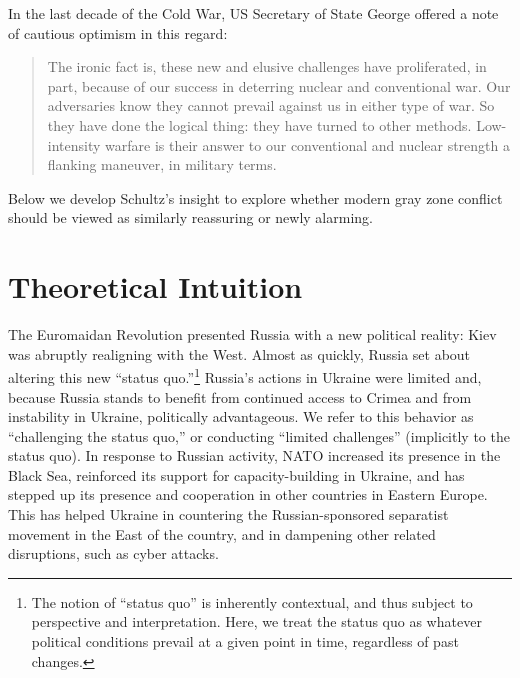 \documentclass[bibtex, autowc]{apsr_submission}
\begin{document}
In the last decade of the Cold War, US Secretary of State George \citet{schultz_lowintensitywarfarechallenge_1986} offered a note of cautious optimism in this regard:
    
    \begin{quote}
        The ironic fact is, these new and elusive challenges have proliferated, in part, because of our success in deterring nuclear and conventional war. Our adversaries know they cannot prevail against us in either type of war. So they have done the logical thing: they have turned to other methods. Low-intensity warfare is their answer to our conventional and nuclear strength a flanking maneuver, in military terms.
    \end{quote}
    
Below we develop Schultz's insight to explore whether modern gray zone conflict should be viewed as similarly reassuring or newly alarming. 

\section{Theoretical Intuition}
The Euromaidan Revolution presented Russia with a new political reality: Kiev was abruptly realigning with the West. Almost as quickly, Russia set about altering this new ``status quo.''\footnote{The notion of ``status quo'' is inherently contextual, and thus subject to perspective and interpretation. Here, we treat the status quo as whatever political conditions prevail at a given point in time, regardless of past changes.} Russia's actions in Ukraine were limited and, because Russia stands to benefit from continued access to Crimea and from instability in Ukraine, politically advantageous. We refer to this behavior as ``challenging the status quo,'' or conducting ``limited challenges'' (implicitly to the status quo). In response to Russian activity, NATO increased its presence in the Black Sea, reinforced its support for capacity-building in Ukraine, and has stepped up its presence and cooperation in other countries in Eastern Europe. This has helped Ukraine in countering the Russian-sponsored separatist movement in the East of the country, and in dampening other related disruptions, such as cyber attacks.
\end{document}
